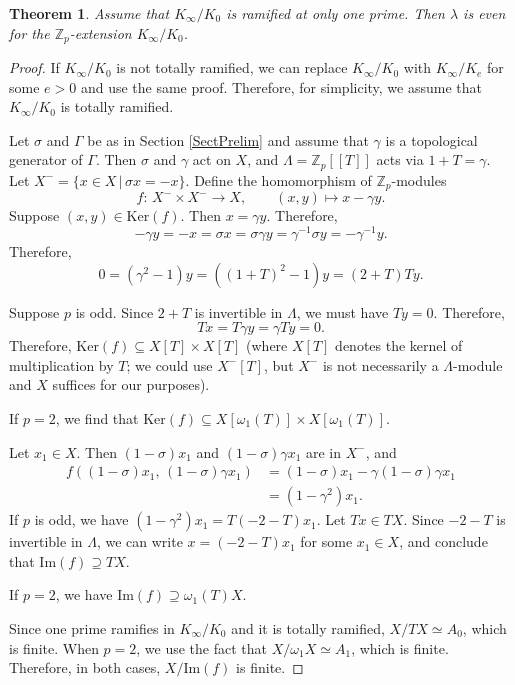 \documentclass{amsart}
\newtheorem{theorem}{Theorem}
\begin{document}
\begin{theorem}\label{PropEven} Assume that $K_{\infty}/K_0$ is ramified at only one prime.
Then $\lambda$ is even for the $\mathbb Z_p$-extension $K_{\infty}/K_0$.
\end{theorem}
\begin{proof} 
If $K_{\infty}/K_0$ is not totally ramified, we can replace $K_{\infty}/K_0$ with $K_{\infty}/K_e$ for some $e>0$ and use the same proof.
Therefore, for simplicity, we assume that $K_{\infty}/K_0$ is totally ramified.

Let $\sigma$ and $\Gamma$ be as in Section \ref{SectPrelim} and assume that $\gamma$ is a topological generator of $\Gamma$.
Then $\sigma$ and $\gamma$ act on $X$, and $\Lambda=\mathbb Z_p[[T]]$ acts via $1+T=\gamma$. 
Let $X^- = \{x\in X\, |\, \sigma x=-x\}$.
Define the homomorphism of $\mathbb Z_p$-modules
$$
f: \, X^-\times X^- \rightarrow X, \qquad (x,y)\mapsto x-\gamma y.
$$
Suppose $(x,y)\in \text{Ker}(f)$. Then $x=\gamma y$. Therefore,
$$
-\gamma y =-x=\sigma x = \sigma\gamma y=\gamma^{-1} \sigma y = -\gamma^{-1}y.
$$
Therefore,
$$
0=(\gamma^2 -1)y = ((1+T)^2-1)y = (2+T)Ty.
$$


Suppose $p$ is odd.
Since $2+T$ is invertible in $\Lambda$, we must have $Ty=0$. Therefore, 
$$
Tx=T\gamma y = \gamma Ty = 0.$$
Therefore, $\text{Ker}(f)\subseteq X[T]\times X[T]$ (where $X[T]$ denotes the kernel of 
multiplication by $T$; we could use $X^-[T]$, but $X^-$ is not necessarily
a $\Lambda$-module and $X$ suffices for our purposes).

If $p=2$, we find that $\text{Ker}(f)\subseteq X[\omega_1(T)]\times X[\omega_1(T)]$.


Let $x_1\in X$. Then
$(1-\sigma)  x_1$ and $(1-\sigma)\gamma x_1$ are in $X^{-}$, and
\begin{align*}
f\left((1-\sigma) x_1, \, (1-\sigma)\gamma x_1\right) &= (1-\sigma) x_1-\gamma (1-\sigma)\gamma x_1\\
&=(1-\gamma^2)x_1.
\end{align*}
If $p$ is odd, we have $(1-\gamma^2)x_1 = T(-2-T)x_1$. Let $Tx\in TX$. Since $-2-T$ is invertible in $\Lambda$, 
we can write $x=(-2-T)x_1$ for some $x_1\in X$, and conclude that $\text{Im}(f)\supseteq TX$.

If $p=2$, we have $\text{Im}(f)\supseteq \omega_1(T)X$.

Since one prime ramifies in $K_{\infty}/K_0$ and it is totally ramified, $X/TX\simeq A_0$, which is finite.
When $p=2$, we use the fact that $X/\omega_1X\simeq A_1$, which is finite.
Therefore, in both cases, $X/\text{Im}(f)$ is finite.


\end{proof}
\end{document}
